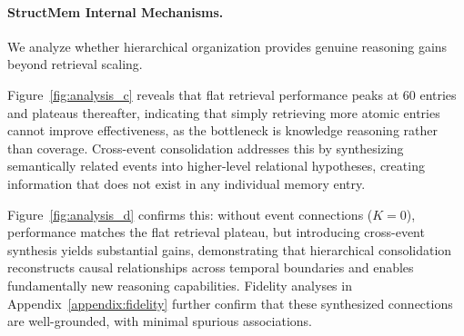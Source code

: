 \paragraph{StructMem Internal Mechanisms.} 
\label{Internal_Mechanisms}
We analyze whether hierarchical organization provides genuine reasoning gains beyond retrieval scaling. 

Figure~\ref{fig:analysis_c} reveals that flat retrieval performance peaks at 60 entries and plateaus thereafter, indicating that simply retrieving more atomic entries cannot improve effectiveness, as the bottleneck is knowledge reasoning rather than coverage. Cross-event consolidation addresses this by synthesizing semantically related events into higher-level relational hypotheses, creating information that does not exist in any individual memory entry.

Figure~\ref{fig:analysis_d} confirms this: without event connections ($K=0$), performance matches the flat retrieval plateau, but introducing cross-event synthesis yields substantial gains, demonstrating that hierarchical consolidation reconstructs causal relationships across temporal boundaries and enables fundamentally new reasoning capabilities. Fidelity analyses in Appendix~\ref{appendix:fidelity} further confirm that these synthesized connections are well-grounded, with minimal spurious associations.